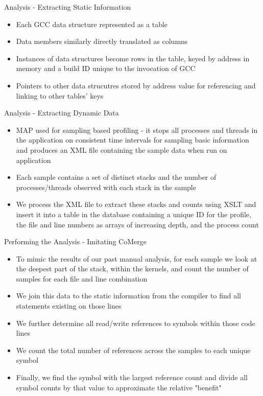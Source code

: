 \documentclass[final]{beamer}
\let\olditem\item
\renewcommand{\item}{\vspace{\fill}\olditem}
\begin{document}
\begin{frame}{\hspace{0.02\paperwidth}Analysis - Extracting Static Information}
\begin{itemize}
\item Each \acs{GCC} data structure represented as a table
\item Data members similarly directly translated as columns
\item Instances of data structures become rows in the table, keyed by address in memory and a build ID unique to the invocation of \acs{GCC}
\item Pointers to other data strucutres stored by address value for referencing and linking to other tables' keys
\end{itemize}
\end{frame}

\begin{frame}{\hspace{0.02\paperwidth}Analysis - Extracting Dynamic Data}
\begin{itemize}
\item MAP used for sampling based profiling - it stops all processes and threads in the application on consistent time intervals for sampling basic information and produces an \acs{XML} file containing the sample data when run on application
\item Each sample contains a set of distinct stacks and the number of processes/threads observed with each stack in the sample
\item We process the \acs{XML} file to extract these stacks and counts using \acs{XSLT} and insert it into a table in the database containing a unique ID for the profile, the file and line numbers as arrays of increasing depth, and the process count
\end{itemize}
\end{frame}

\begin{frame}{\hspace{0.02\paperwidth}Performing the Analysis - Imitating CoMerge}
\begin{itemize}
\item To mimic the results of our past manual analysis, for each sample we look at the deepest part of the stack, within the kernels, and count the number of samples for each file and line combination
\item We join this data to the static information from the compiler to find all statements existing on those lines
\item We further determine all read/write references to symbols within those code lines
\item We count the total number of references across the samples to each unique symbol
\item Finally, we find the symbol with the largest reference count and divide all symbol counts by that value to approximate the relative "benefit"
\end{itemize}
\end{frame}
\end{document}

